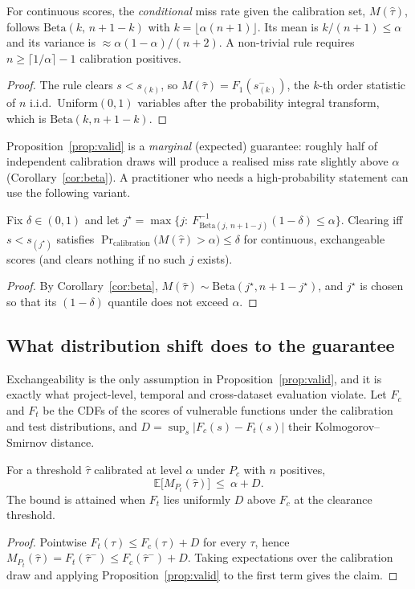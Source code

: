 \begin{corollary}\label{cor:beta}
For continuous scores, the \emph{conditional} miss rate given the calibration set, $M(\hat\tau)$, follows $\mathrm{Beta}(k,\,n+1-k)$ with $k=\lfloor\alpha(n+1)\rfloor$.
Its mean is $k/(n+1)\le\alpha$ and its variance is $\approx\alpha(1-\alpha)/(n+2)$. A non-trivial rule requires $n\ge\lceil1/\alpha\rceil-1$ calibration positives.
\end{corollary}
\begin{proof}
The rule clears $s<s_{(k)}$, so $M(\hat\tau)=F_1(s_{(k)}^-)$, the $k$-th order statistic of $n$ i.i.d.\ Uniform$(0,1)$ variables after the probability integral transform, which is $\mathrm{Beta}(k,n{+}1{-}k)$.
\end{proof}

Proposition~\ref{prop:valid} is a \emph{marginal} (expected) guarantee: roughly half of independent calibration draws will produce a realised miss rate slightly above $\alpha$ (Corollary~\ref{cor:beta}).
A practitioner who needs a high-probability statement can use the following variant.

\begin{proposition}\label{prop:pac}
Fix $\delta\in(0,1)$ and let $j^\star=\max\{j:\ F^{-1}_{\mathrm{Beta}(j,\,n+1-j)}(1-\delta)\le\alpha\}$. Clearing iff $s<s_{(j^\star)}$ satisfies $\Pr_{\text{calibration}}\bigl(M(\hat\tau)>\alpha\bigr)\le\delta$ for continuous, exchangeable scores (and clears nothing if no such $j$ exists).
\end{proposition}
\begin{proof}
By Corollary~\ref{cor:beta}, $M(\hat\tau)\sim\mathrm{Beta}(j^\star,n{+}1{-}j^\star)$, and $j^\star$ is chosen so that its $(1-\delta)$ quantile does not exceed $\alpha$.
\end{proof}

\subsection{What distribution shift does to the guarantee}
Exchangeability is the only assumption in Proposition~\ref{prop:valid}, and it is exactly what project-level, temporal and cross-dataset evaluation violate.
Let $F_c$ and $F_t$ be the CDFs of the scores of vulnerable functions under the calibration and test distributions, and $D=\sup_s|F_c(s)-F_t(s)|$ their Kolmogorov--Smirnov distance.

\begin{proposition}\label{prop:shift}
For a threshold $\hat\tau$ calibrated at level $\alpha$ under $P_c$ with $n$ positives,
\[
\mathbb E\bigl[M_{P_t}(\hat\tau)\bigr]\ \le\ \alpha + D .
\]
The bound is attained when $F_t$ lies uniformly $D$ above $F_c$ at the clearance threshold.
\end{proposition}
\begin{proof}
Pointwise $F_t(\tau)\le F_c(\tau)+D$ for every $\tau$, hence $M_{P_t}(\hat\tau)=F_t(\hat\tau^-)\le F_c(\hat\tau^-)+D$. Taking expectations over the calibration draw and applying Proposition~\ref{prop:valid} to the first term gives the claim.
\end{proof}

